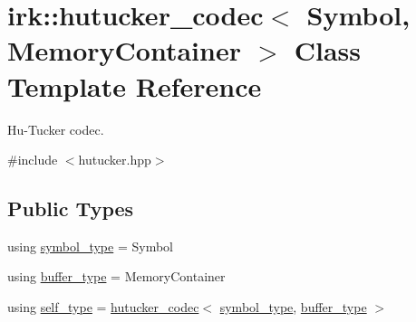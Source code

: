 \hypertarget{classirk_1_1hutucker__codec}{}\section{irk\+:\+:hutucker\+\_\+codec$<$ Symbol, Memory\+Container $>$ Class Template Reference}
\label{classirk_1_1hutucker__codec}


Hu-\/\+Tucker codec.  




{\ttfamily \#include $<$hutucker.\+hpp$>$}

\subsection*{Public Types}
\begin{DoxyCompactItemize}
\item 
using \mbox{\hyperlink{classirk_1_1hutucker__codec_af23dee5959ae2a69eea0ab324cf6ecb6}{symbol\+\_\+type}} = Symbol
\item 
using \mbox{\hyperlink{classirk_1_1hutucker__codec_a995378c8c253dae9867a4b1762eeaf95}{buffer\+\_\+type}} = Memory\+Container
\item 
using \mbox{\hyperlink{classirk_1_1hutucker__codec_a507a089f939f5fd77a38245598e5a9a2}{self\+\_\+type}} = \mbox{\hyperlink{classirk_1_1hutucker__codec}{hutucker\+\_\+codec}}$<$ \mbox{\hyperlink{classirk_1_1hutucker__codec_af23dee5959ae2a69eea0ab324cf6ecb6}{symbol\+\_\+type}}, \mbox{\hyperlink{classirk_1_1hutucker__codec_a995378c8c253dae9867a4b1762eeaf95}{buffer\+\_\+type}} $>$
\end{DoxyCompactItemize}
